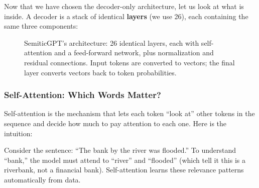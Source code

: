 \documentclass[11pt,a4paper]{article}
\begin{document}
Now that we have chosen the decoder-only architecture, let us look at what is inside. A decoder is a stack of identical \textbf{layers} (we use 26), each containing the same three components:

\begin{figure}[H]
\centering
{}
\caption{SemiticGPT's architecture: 26 identical layers, each with self-attention and a feed-forward network, plus normalization and residual connections. Input tokens are converted to vectors; the final layer converts vectors back to token probabilities.}
\label{fig:architecture}
\end{figure}

\subsubsection{Self-Attention: Which Words Matter?}

Self-attention is the mechanism that lets each token ``look at'' other tokens in the sequence and decide how much to pay attention to each one. Here is the intuition:

Consider the sentence: ``The bank by the river was flooded.'' To understand ``bank,'' the model must attend to ``river'' and ``flooded'' (which tell it this is a riverbank, not a financial bank). Self-attention learns these relevance patterns automatically from data.
\end{document}

